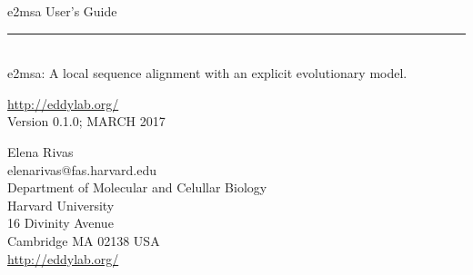 \begin{titlepage}
{\Large

\vspace*{\fill}

\noindent
{\Huge {e2msa User's Guide}} \vspace{-8.0pt} \\ 
\rule[2pt]{\textwidth}{1pt} \\
\hspace*{\fill} {\large {e2msa: A local sequence alignment with an explicit evolutionary model.} \\ }

\vspace*{\fill}

\begin{center}
\url{http://eddylab.org/}\\
Version 0.1.0; MARCH 2017 \\ 

\vspace*{\fill}

Elena Rivas\\
elenarivas@fas.harvard.edu\\
Department of Molecular and Celullar Biology\\
Harvard University\\
16 Divinity Avenue\\
Cambridge MA 02138 USA\\
\url{http://eddylab.org/} \\
\end{center}

\vspace*{\fill}

}
\end{titlepage}
